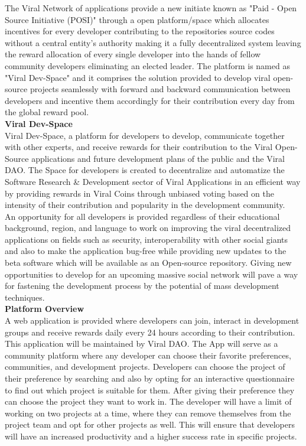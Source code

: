 \documentclass[10pt]{article}
\begin{document}
The Viral Network of applications provide a new initiate known as "Paid - Open Source Initiative (POSI)" through a open platform/space which allocates incentives for every developer contributing to the repositories source codes without a central entity's authority making it a fully decentralized system leaving the reward allocation of every single developer into the hands of fellow community developers eliminating an elected leader. The platform is named as "Viral Dev-Space" and it comprises the solution provided to develop viral open-source projects seamlessly with forward and backward communication between developers and incentive them accordingly for their contribution every day from the global reward pool.\\

\textbf{Viral Dev-Space}\\

Viral Dev-Space, a platform for developers to develop, communicate together with other experts, and receive rewards for their contribution to the Viral Open-Source applications and future development plans of the public and the Viral DAO. The Space for developers is created to decentralize and automatize the Software Research \& Development sector of Viral Applications in an efficient way by providing rewards in Viral Coins through unbiased voting based on the intensity of their contribution and popularity in the development community.\\

An opportunity for all developers is provided regardless of their educational background, region, and language to work on improving the viral decentralized applications on fields such as security, interoperability with other social giants and also to make the application bug-free while providing new updates to the beta software which will be available as an Open-source repository. Giving new opportunities to develop for an upcoming massive social network will pave a way for fastening the development process by the potential of mass development techniques.\\


\textbf{Platform Overview}\\

A web application is provided where developers can join, interact in development groups and receive rewards daily every 24 hours according to their contribution. This application will be maintained by Viral DAO. The App will serve as a community platform where any developer can choose their favorite preferences, communities, and development projects. Developers can choose the project of their preference by searching and also by opting for an interactive questionnaire to find out which project is suitable for them. After giving their preference they can choose the project they want to work in. The developer will have a limit of working on two projects at a time, where they can remove themselves from the project team and opt for other projects as well. This will ensure that developers will have an increased productivity and a higher success rate in specific projects.\\
\end{document}

